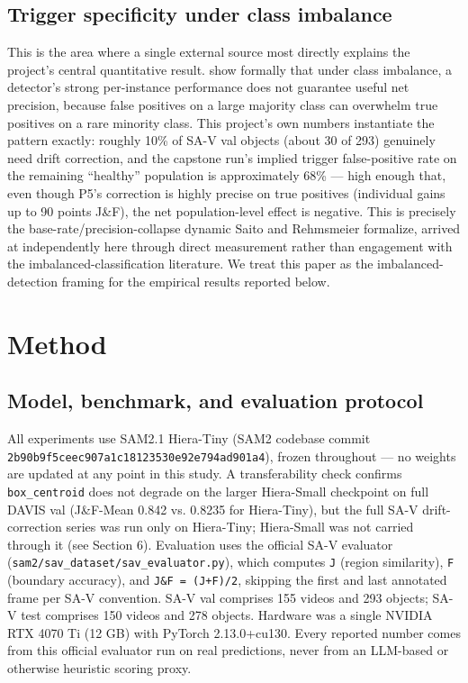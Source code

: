 \documentclass[11pt]{article}
\begin{document}
\subsection{Trigger specificity under class imbalance}

This is the area where a single external source most directly explains the project's central quantitative result. \citet{saito2015} show formally that under class imbalance, a detector's strong per-instance performance does not guarantee useful net precision, because false positives on a large majority class can overwhelm true positives on a rare minority class. This project's own numbers instantiate the pattern exactly: roughly 10\% of SA-V val objects (about 30 of 293) genuinely need drift correction, and the capstone run's implied trigger false-positive rate on the remaining ``healthy'' population is approximately 68\% — high enough that, even though P5's correction is highly precise on true positives (individual gains up to 90 points J\&F), the net population-level effect is negative. This is precisely the base-rate/precision-collapse dynamic Saito and Rehmsmeier formalize, arrived at independently here through direct measurement rather than engagement with the imbalanced-classification literature. We treat this paper as the imbalanced-detection framing for the empirical results reported below.

\section{Method}

\subsection{Model, benchmark, and evaluation protocol}

All experiments use SAM2.1 Hiera-Tiny (SAM2 codebase commit \texttt{2b90b9f5ceec907a1c18\allowbreak 123530e92e794ad901a4}), frozen throughout — no weights are updated at any point in this study. A transferability check confirms \texttt{box\_centroid} does not degrade on the larger Hiera-Small checkpoint on full DAVIS val (J\&F-Mean 0.842 vs. 0.8235 for Hiera-Tiny), but the full SA-V drift-correction series was run only on Hiera-Tiny; Hiera-Small was not carried through it (see Section 6). Evaluation uses the official SA-V evaluator (\texttt{sam2/sav\_dataset/sav\_evaluator.py}), which computes \texttt{J} (region similarity), \texttt{F} (boundary accuracy), and \texttt{J\&F = (J+F)/2}, skipping the first and last annotated frame per SA-V convention. SA-V val comprises 155 videos and 293 objects; SA-V test comprises 150 videos and 278 objects. Hardware was a single NVIDIA RTX 4070 Ti (12 GB) with PyTorch 2.13.0+cu130. Every reported number comes from this official evaluator run on real predictions, never from an LLM-based or otherwise heuristic scoring proxy.
\end{document}
